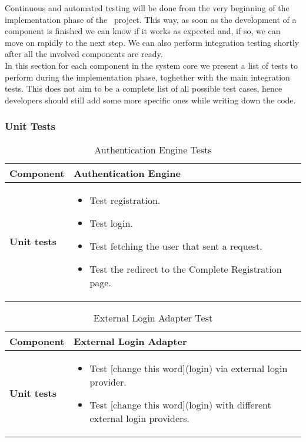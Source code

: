 Continuous and automated testing will be done from the very beginning of the implementation phase of the \projectname~project. This way, as soon as the development of a component is finished we can know if it works as expected and, if so, we can move on rapidly to the next step. We can also perform integration testing shortly after all the involved components are ready. \\
In this section for each component in the system core we present a list of tests to perform during the implementation phase, toghether with the main integration tests. This does not aim to be a complete list of all possible test cases, hence developers should still add some more specific ones while writing down the code. \\

\subsubsection{Unit Tests}

\begin{table}[H]	
	\centering
	\def\arraystretch{1.5}
	\begin{tabular}{|m{4cm}|m{12cm}|}
		\hline
		\textbf{Component} & Authentication Engine \\ \hline
		\textbf{Unit tests} & 
			\begin{itemize}
			\item Test registration.
			\item Test login.
			\item Test fetching the user that sent a request.
			\item Test the redirect to the Complete Registration page.
			\end{itemize} \\ \hline
	\end{tabular}
	\caption{Authentication Engine Tests}
\end{table}

\begin{table}[H]	
	\centering
	\def\arraystretch{1.5}
	\begin{tabular}{|m{4cm}|m{12cm}|}
		\hline
		\textbf{Component} & External Login Adapter \\ \hline
		\textbf{Unit tests} & 
			\begin{itemize}
			\item Test [change this word](login) via external login provider.
			\item Test [change this word](login) with different external login providers.
			\end{itemize} \\ \hline
	\end{tabular}
	\caption{External Login Adapter Test}
\end{table}


